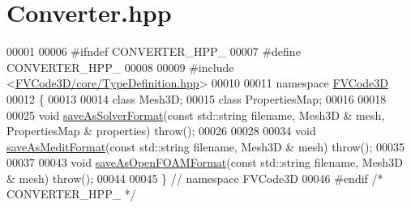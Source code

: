 \hypertarget{Converter_8hpp_source}{}\section{Converter.\+hpp}
\label{Converter_8hpp_source}

\begin{DoxyCode}
00001 
00006 \textcolor{preprocessor}{#ifndef CONVERTER\_HPP\_}
00007 \textcolor{preprocessor}{#define CONVERTER\_HPP\_}
00008 
00009 \textcolor{preprocessor}{#include <\hyperlink{TypeDefinition_8hpp}{FVCode3D/core/TypeDefinition.hpp}>}
00010 
00011 \textcolor{keyword}{namespace }\hyperlink{namespaceFVCode3D}{FVCode3D}
00012 \{
00013 
00014 \textcolor{keyword}{class }Mesh3D;
00015 \textcolor{keyword}{class }PropertiesMap;
00016 
00018 
00025 \textcolor{keywordtype}{void} \hyperlink{namespaceFVCode3D_ab3d72976b29466b3b389c290d0e8dadb}{saveAsSolverFormat}(\textcolor{keyword}{const} std::string filename, Mesh3D & mesh, PropertiesMap & 
      properties) \textcolor{keywordflow}{throw}();
00026 
00028 
00034 \textcolor{keywordtype}{void} \hyperlink{namespaceFVCode3D_a309feff3c4ef28a971e23350d895579c}{saveAsMeditFormat}(\textcolor{keyword}{const} std::string filename, Mesh3D & mesh) \textcolor{keywordflow}{throw}();
00035 
00037 
00043 \textcolor{keywordtype}{void} \hyperlink{namespaceFVCode3D_a2f158b0ae2187840985b44465f65e126}{saveAsOpenFOAMFormat}(\textcolor{keyword}{const} std::string filename, Mesh3D & mesh) \textcolor{keywordflow}{throw}();
00044 
00045 \} \textcolor{comment}{// namespace FVCode3D}
00046 \textcolor{preprocessor}{#endif }\textcolor{comment}{/* CONVERTER\_HPP\_ */}\textcolor{preprocessor}{}
\end{DoxyCode}
